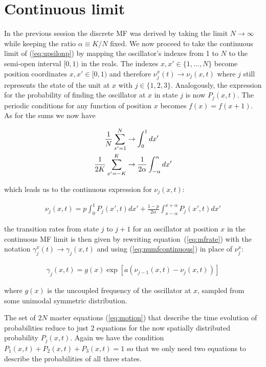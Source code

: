 \section{Continuous limit}

In the previous session the discrete MF was derived by taking the limit $N\to\infty$ while keeping the ratio $\alpha\equiv K/N$ fixed.
We now proceed to take the continuous limit of (\ref{eq:upsilonp}) by mapping the oscillator's indexes from 1 to $N$ to the semi-open
interval $[0,1)$ in the reals. The indexes $x,x' \in \{1,...,N\}$ become position coordinates $x,x'\in [0,1)$ and therefore $\nu^x_j(t)
\to \nu_j(x,t)$ where $j$ still represents the state of the unit at $x$ with $j\in\{1,2,3\}$. Analogously, the expression for the
probability of finding the oscillator at $x$ in state $j$ is now $P_j(x,t)$. The periodic conditions for any function of position $x$
becomes $f(x)=f(x+1)$. As for the sums we now have

\begin{align}
    \frac{1}{N}\sum_{x'=1}^N &\to \int_{0}^{1} dx' \notag\\
    \frac{1}{2K}\sum_{x'=-K}^K &\to \frac{1}{2\alpha}\int_{-\alpha}^{\alpha} dx'
\end{align}

\noindent which leads us to the continuous expression for $\nu_j(x,t)$:

\begin{align}
    \nu_j(x,t) = p \int_0^1 P_j(x',t)dx' + \frac{1-p}{2\alpha}\int_{x-\alpha}^{x+\alpha} P_j(x',t)dx'
    \label{eq:numfcontinuous}
\end{align}

\noindent the transition rates from state $j$ to $j+1$ for an oscillator at position $x$ in the continuous MF limit is then given by
rewriting equation~(\ref{eq:mfrate}) with the notation $\gamma^x_j(t) \to \gamma_j(x,t)$ and using (\ref{eq:numfcontinuous}) in place
of $\nu^x_j$:

\begin{align}
    \gamma_j(x,t) = g(x) \exp\left[ a\left( \nu_{j-1}(x,t) - \nu_j(x,t) \right) \right]
    \label{eq:ratecontinuous}
\end{align}

\noindent where $g(x)$ is the uncoupled frequency of the oscillator at $x$, sampled from some unimodal symmetric distribution.

The set of $2N$ master equations (\ref{eq:motion}) that describe the time evolution of probabilities reduce to just 2 equations for the
now spatially distributed probability $P_j(x,t)$. Again we have the condition $P_1(x,t) + P_2(x,t) + P_3(x,t)=1$ so that we only need
two equations to describe the probabilities of all three states.

